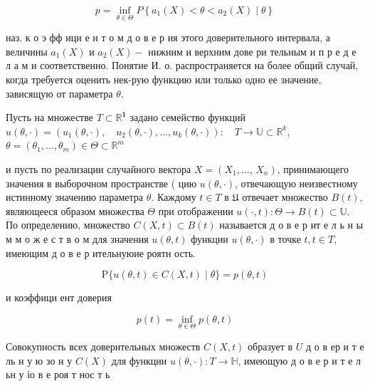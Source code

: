 \documentclass[10pt]{article}
\begin{document}
\[

p=\inf _{\theta \in \Theta} P\left\{a_{1}(X)<\theta<a_{2}(X) \mid \theta\right\}

\]



наз. к о э фф ици е н т о м д о в е р ия этого доверительного интервала, а величины $a_{1}(X)$ и $a_{2}(X)-$ нижним и верхним дове ри тельным и п р е д е л а м и соответственно. Понятие И. о. распространяется на более общий случай, когда требуется оценить нек-рую функцию или только одно ее значение, зависящую от параметра $\theta$.



Пусть на множестве $T \subset \mathbb{R}^{\mathbf{1}}$ задано семейство функций $u(\theta, \cdot)=\left(u_{1}(\theta, \cdot), \quad u_{2}(\theta, \cdot), \ldots, u_{k}(\theta, \cdot)\right): \quad T \rightarrow \mathbb{U} \subset \mathbb{R}^{k}$, $\theta=\left(\theta_{1}, \ldots, \theta_{m}\right) \in \Theta \subset \mathbb{R}^{m}$



и пусть по реализации случайного вектора $X=\left(X_{1}, \ldots\right.$, $\left.X_{n}\right)$, принимающего значения в выборочном пространстве ( цию $u(\theta, \cdot)$, отвечающую неизвестному истинному значению параметра $\theta$. Каждому $t \in T$ в $\mathfrak{U}$ отвечает множество $B(t)$, являющееся образом множества $\Theta$ при отображении $u(\cdot, t): \Theta \rightarrow B(t) \subset \mathbb{U}$. По определению, множество $C(X, t) \subset B(t)$ называется д о в е р ит е л ь н ы м м о ж е с т в о м для значения $u(\theta, t)$ функции $u(\theta, \cdot)$ в точке $t, t \in T$, имеющим д о в е р ительнуюие роятн ость.



\[

\mathrm{P}\{u(\theta, t) \in C(X, t) \mid \theta\}=p(\theta, t)

\]



и коэффици ент доверия



\[

p(t)=\inf _{\theta \in \Theta} p(\theta, t)

\]



Совокупность всех доверительных множеств $C(X, t)$ образует в $U$ д о в ер и т е ль н у ю зо н у $C(X)$ для функции $u(\theta, \cdot): T \rightarrow \mathbb{H}$, имеющую д о в е р и т е л ьн у іо в е роя т нос т ь
\end{document}
